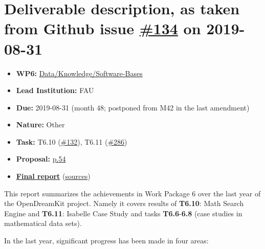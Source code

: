 \hypertarget{deliverable-description-as-taken-from-github-issue-134-on-2019-08-31}{%
\section*{\texorpdfstring{Deliverable description, as taken from Github
issue
\href{https://github.com/OpenDreamKit/OpenDreamKit/issues/134}{\#134} on
2019-08-31}{Deliverable description, as taken from Github issue \#134 on 2019-08-31}}\label{deliverable-description-as-taken-from-github-issue-134-on-2019-08-31}}

\begin{itemize}
\tightlist
\item
  \textbf{WP6:}
  \href{https://github.com/OpenDreamKit/OpenDreamKit/tree/master/WP6}{Data/Knowledge/Software-Bases}
\item
  \textbf{Lead Institution:} FAU
\item
  \textbf{Due:} 2019-08-31 (month 48; postponed from M42 in the last
  amendment)
\item
  \textbf{Nature:} Other
\item
  \textbf{Task:} T6.10
  (\href{https://github.com/OpenDreamKit/OpenDreamKit/issues/132}{\#132}),
  T6.11
  (\href{https://github.com/OpenDreamKit/OpenDreamKit/issues/286}{\#286})
\item
  \textbf{Proposal:}
  \href{https://github.com/OpenDreamKit/OpenDreamKit/raw/master/Proposal/proposal-www.pdf}{p.54}
\item
  \textbf{\href{https://github.com/OpenDreamKit/OpenDreamKit/raw/master/WP6/D6.10/report-final.pdf}{Final
  report}}
  (\href{https://github.com/OpenDreamKit/OpenDreamKit/raw/master/WP6/D6.10/}{sources})
\end{itemize}

This report summarizes the achievements in Work Package 6 over the last
year of the OpenDreamKit project. Namely it covers results of
\textbf{T6.10}: Math Search Engine and \textbf{T6.11}: Isabelle Case
Study and tasks \textbf{T6.6}-\textbf{6.8} (case studies in mathematical
data sets).

In the last year, significant progress has been made in four areas:

